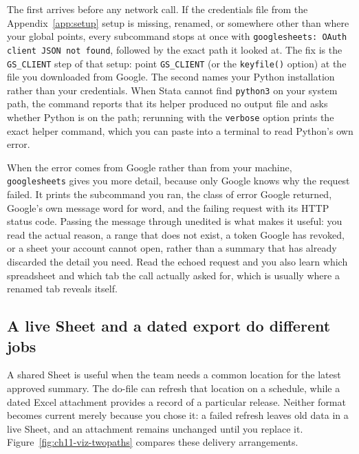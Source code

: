 The first arrives before any network call. If the credentials file from the Appendix~\ref{app:setup} setup is missing, renamed, or somewhere other than where your global points, every subcommand stops at once with \texttt{googlesheets: OAuth client JSON not found}, followed by the exact path it looked at. The fix is the \texttt{GS\_CLIENT} step of that setup: point \texttt{GS\_CLIENT} (or the \texttt{keyfile()} option) at the file you downloaded from Google. The second names your Python installation rather than your credentials. When Stata cannot find \texttt{python3} on your system path, the command reports that its helper produced no output file and asks whether Python is on the path; rerunning with the \texttt{verbose} option prints the exact helper command, which you can paste into a terminal to read Python's own error.

When the error comes from Google rather than from your machine, \texttt{googlesheets} gives you more detail, because only Google knows why the request failed. It prints the subcommand you ran, the class of error Google returned, Google's own message word for word, and the failing request with its HTTP status code. Passing the message through unedited is what makes it useful: you read the actual reason, a range that does not exist, a token Google has revoked, or a sheet your account cannot open, rather than a summary that has already discarded the detail you need. Read the echoed request and you also learn which spreadsheet and which tab the call actually asked for, which is usually where a renamed tab reveals itself.

\subsection{A live Sheet and a dated export do different jobs}
A shared Sheet is useful when the team needs a common location for the latest approved summary. The do-file can refresh that location on a schedule, while a dated Excel attachment provides a record of a particular release. Neither format becomes current merely because you chose it: a failed refresh leaves old data in a live Sheet, and an attachment remains unchanged until you replace it. Figure~\ref{fig:ch11-viz-twopaths} compares these delivery arrangements.


